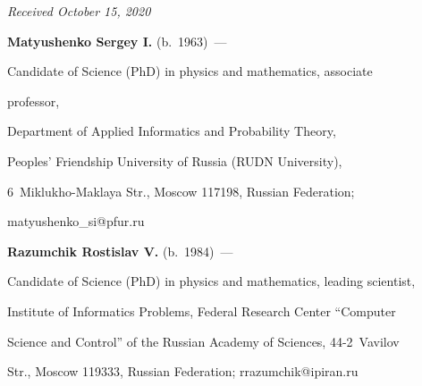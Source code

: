




\vspace*{-6pt}





\hfill{\small\textit{Received October 15, 2020}}










\vspace*{-20pt}








\Contr





\vspace*{-4pt}





\noindent


\textbf{Matyushenko Sergey I.} (b.\ 1963)~---


Candidate of Science (PhD) in physics and mathematics, associate 


professor,


Department of Applied Informatics and Probability Theory,


Peoples' Friendship University of Russia (RUDN University), 


6~Miklukho-Maklaya Str., Moscow 117198, Russian Federation; 


\mbox{matyushenko\_si@pfur.ru}





\vspace*{3pt}





\noindent


\textbf{Razumchik Rostislav V.} (b.\ 1984)~---


Candidate of Science (PhD) in physics and mathematics, leading scientist,


Institute of Informatics Problems, Federal Research Center ``Computer 


Science and Control'' of the Russian Academy of Sciences, 44-2~Vavilov 


Str., Moscow 119333, Russian Federation; \mbox{rrazumchik@ipiran.ru}





\label{end\stat}





\renewcommand{\bibname}{\protect\rm Литература} 


